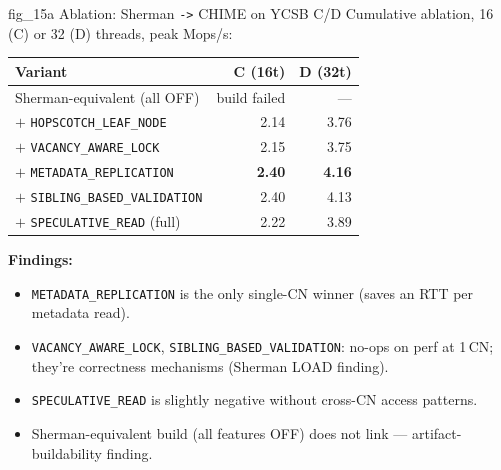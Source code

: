 \begin{frame}{fig\_15a Ablation: Sherman \texttt{->} CHIME on YCSB C/D}
\small Cumulative ablation, 16 (C) or 32 (D) threads, peak Mops/s:
\vspace{0.3em}
\begin{center}
\begin{tabular}{@{}lrr@{}}
\toprule
Variant & C (16t) & D (32t) \\
\midrule
Sherman-equivalent (all OFF)             & {\color{mRed}build failed} & --- \\
$+$ \texttt{HOPSCOTCH\_LEAF\_NODE}       & 2.14 & 3.76 \\
$+$ \texttt{VACANCY\_AWARE\_LOCK}        & 2.15 & 3.75 \\
$+$ \texttt{METADATA\_REPLICATION}       & {\color{mGreen}\textbf{2.40}} & {\color{mGreen}\textbf{4.16}} \\
$+$ \texttt{SIBLING\_BASED\_VALIDATION}  & 2.40 & 4.13 \\
$+$ \texttt{SPECULATIVE\_READ} (full)    & 2.22 & 3.89 \\
\bottomrule
\end{tabular}
\end{center}
\vspace{0.3em}
\textbf{Findings:}
\begin{itemize}[nosep]
    \item \texttt{METADATA\_REPLICATION} is the only single-CN winner (saves an RTT per metadata read).
    \item \texttt{VACANCY\_AWARE\_LOCK}, \texttt{SIBLING\_BASED\_VALIDATION}: no-ops on perf at 1\,CN; they're correctness mechanisms (Sherman LOAD finding).
    \item \texttt{SPECULATIVE\_READ} is slightly negative without cross-CN access patterns.
    \item Sherman-equivalent build (all features OFF) does not link --- artifact-buildability finding.
\end{itemize}
\end{frame}

